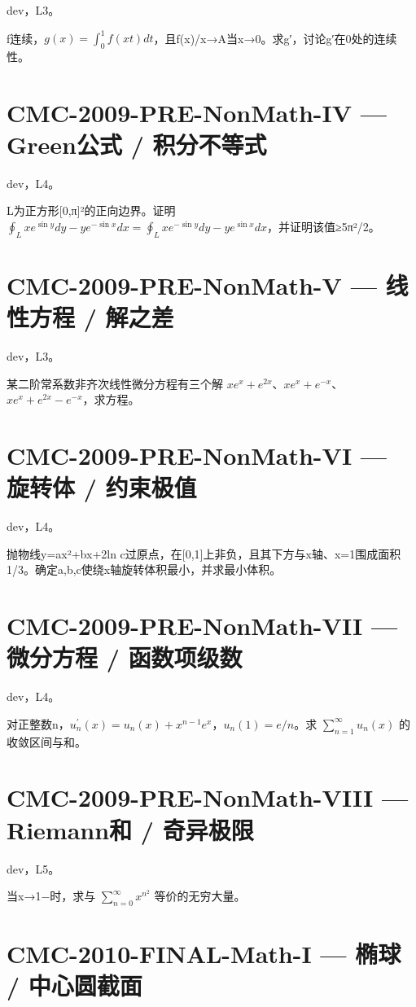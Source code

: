 \documentclass[UTF8]{ctexart}
\begin{document}
dev，L3。

f连续，$g(x)=\int_0^1f(xt)dt$，且f(x)/x→A当x→0。求g′，讨论g′在0处的连续性。

\section*{CMC-2009-PRE-NonMath-IV — Green公式 / 积分不等式}

dev，L4。

L为正方形[0,π]²的正向边界。证明 $\oint_Lxe^{\sin y}dy-ye^{-\sin x}dx=\oint_Lxe^{-\sin y}dy-ye^{\sin x}dx$，并证明该值≥5π²/2。

\section*{CMC-2009-PRE-NonMath-V — 线性方程 / 解之差}

dev，L3。

某二阶常系数非齐次线性微分方程有三个解 $xe^x+e^{2x}$、$xe^x+e^{-x}$、$xe^x+e^{2x}-e^{-x}$，求方程。

\section*{CMC-2009-PRE-NonMath-VI — 旋转体 / 约束极值}

dev，L4。

抛物线y=ax²+bx+2ln c过原点，在[0,1]上非负，且其下方与x轴、x=1围成面积1/3。确定a,b,c使绕x轴旋转体积最小，并求最小体积。

\section*{CMC-2009-PRE-NonMath-VII — 微分方程 / 函数项级数}

dev，L4。

对正整数n，$u_n^{\prime}(x)=u_n(x)+x^{n-1}e^x$，$u_n(1)=e/n$。求 $\sum_{n=1}^\infty u_n(x)$ 的收敛区间与和。

\section*{CMC-2009-PRE-NonMath-VIII — Riemann和 / 奇异极限}

dev，L5。

当x→1−时，求与 $\sum_{n=0}^\infty x^{n^2}$ 等价的无穷大量。

\section*{CMC-2010-FINAL-Math-I — 椭球 / 中心圆截面}
\end{document}
